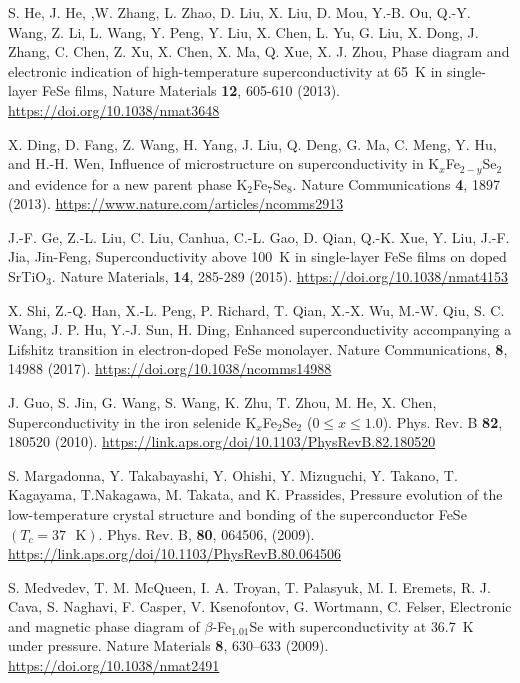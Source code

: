 \documentclass[prb,twocolumn,amsmath,amssymb,superscriptaddress,floatfix,nofootinbib]{revtex4-2}
\begin{document}
\begin{thebibliography}{}
S. He, J. He, ,W. Zhang, L. Zhao, D. Liu, X. Liu, D. Mou, Y.-B. Ou, Q.-Y. Wang, Z. Li, L. Wang, Y. Peng, Y. Liu, X. Chen, L. Yu, G. Liu, X. Dong, J. Zhang, C. Chen, Z. Xu, X. Chen, X. Ma, Q. Xue, X. J. Zhou, {Phase diagram and electronic indication of high-temperature superconductivity at {65~K} in single-layer {FeSe} films}, Nature Materials {\bf 12}, 605-610 (2013). \url{https://doi.org/10.1038/nmat3648}

X. Ding, D. Fang, Z. Wang, H. Yang, J. Liu, Q. Deng, G. Ma, C. Meng, Y. Hu, and H.-H. Wen, {Influence of microstructure on superconductivity in {K$_x$Fe$_{2-y}$Se$_2$} and evidence for a new parent phase {K$_2$Fe$_7$Se$_8$}}. 
Nature Communications {\bf 4}, 1897 (2013). \url{https://www.nature.com/articles/ncomms2913}

J.-F. Ge, Z.-L. Liu, C. Liu, Canhua, C.-L. Gao, D. Qian, Q.-K. Xue, Y. Liu, J.-F. Jia, Jin-Feng, {Superconductivity above {100~K} in single-layer {FeSe} films on doped {SrTiO$_3$}}. Nature Materials, {\bf 14}, 285-289 (2015). 
\url{https://doi.org/10.1038/nmat4153}

X. Shi, Z.-Q. Han, X.-L. Peng, P. Richard, T. Qian, X.-X. Wu, M.-W. Qiu, S. C. Wang, J. P. Hu, Y.-J. Sun, H. Ding, {Enhanced superconductivity accompanying a {{Lifshitz}} transition in electron-doped {FeSe} monolayer}. 
Nature Communications, {\bf 8}, 14988 (2017). \url{https://doi.org/10.1038/ncomms14988}

J. Guo, S. Jin, G. Wang, S. Wang, K. Zhu, T. Zhou, M. He, X. Chen, {Superconductivity in the iron selenide {K$_x$Fe$_2$Se$_2$ ($0 \le x \le 1.0$)}}. Phys. Rev. B {\bf 82}, 180520 (2010). \url{https://link.aps.org/doi/10.1103/PhysRevB.82.180520}

S. Margadonna, Y. Takabayashi, Y. Ohishi, Y. Mizuguchi, Y. Takano, T. Kagayama, T.Nakagawa, M. Takata, and K. Prassides, {Pressure evolution of the low-temperature crystal structure and bonding of the superconductor {FeSe} $({T}_{c}=37\text{ }\text{K})$}. {Phys. Rev. B}, {\bf 80},
{064506}, (2009). \url{https://link.aps.org/doi/10.1103/PhysRevB.80.064506}

S. Medvedev, T. M. McQueen, I. A. Troyan, T. Palasyuk, M. I. Eremets, R. J. Cava, S. Naghavi, F. Casper, V. Ksenofontov, G. Wortmann, C. Felser,
{Electronic and magnetic phase diagram of {$\beta$-Fe$_{1.01}$Se} with superconductivity at {36.7~K} under pressure}. 
{Nature Materials} {\bf 8}, 630--633 (2009). \url{https://doi.org/10.1038/nmat2491}


\end{thebibliography}
\end{document}
